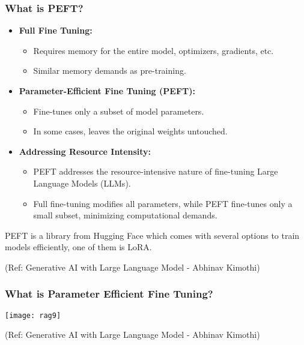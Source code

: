 \begin{frame}[fragile]\frametitle{What is PEFT?}

\begin{itemize}
  \item \textbf{Full Fine Tuning:}
    \begin{itemize}
      \item Requires memory for the entire model, optimizers, gradients, etc.
      \item Similar memory demands as pre-training.
    \end{itemize}

  \item \textbf{Parameter-Efficient Fine Tuning (PEFT):}
    \begin{itemize}
      \item Fine-tunes only a subset of model parameters.
      \item In some cases, leaves the original weights untouched.
    \end{itemize}
	
    \item \textbf{Addressing Resource Intensity:}
      \begin{itemize}
        \item PEFT addresses the resource-intensive nature of fine-tuning Large Language Models (LLMs).
        \item Full fine-tuning modifies all parameters, while PEFT fine-tunes only a small subset, minimizing computational demands.
      \end{itemize}	
\end{itemize}

PEFT is a library from Hugging Face which comes with several options to train models efficiently, one of them is LoRA.

{\tiny (Ref: Generative AI with Large Language Model - Abhinav  Kimothi)}

\end{frame}


\begin{frame}[fragile]\frametitle{What is Parameter Efficient Fine Tuning?}


		\begin{center}
		\texttt{[image: rag9]}
		\end{center}

{\tiny (Ref: Generative AI with Large Language Model - Abhinav  Kimothi)}

\end{frame}





